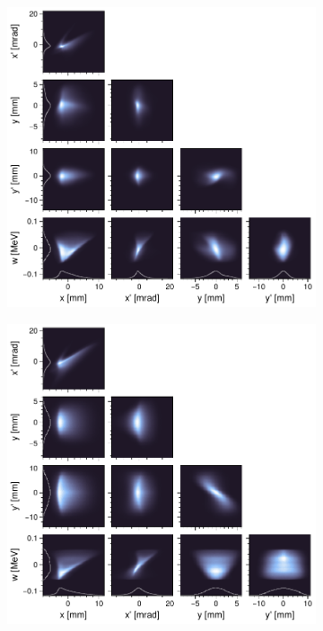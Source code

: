 \documentclass[letterpaper,
               nospread,
               biblatex,
              ]{jacow}
\begin{document}
%
\begin{figure}[!t]
    \centering
    \begin{subfigure}{0.48\textwidth}
        \includegraphics[width=\textwidth]{FRXD3f2a.pdf}
        \caption{}
        \label{fig:VS34_a}
    \end{subfigure}
    \hfill
    \hspace{0.1cm}
    \hfill
    \begin{subfigure}{0.48\textwidth}
        \includegraphics[width=\textwidth]{FRXD3f2b.pdf}

\end{subfigure}
\end{figure}
\end{document}
